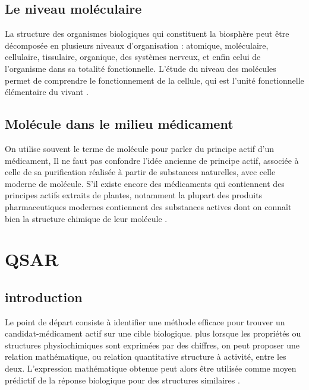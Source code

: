 \documentclass[12pt]{report}
\begin{document}
\subsection{Le niveau moléculaire}
La structure des organismes biologiques qui constituent la biosphère peut être décomposée en plusieurs niveaux d'organisation : atomique, moléculaire, cellulaire, tissulaire, organique, des systèmes nerveux, et enfin celui de l'organisme dans sa totalité fonctionnelle. L'étude du niveau des molécules permet de comprendre le fonctionnement de la cellule, qui est l'unité fonctionnelle élémentaire du vivant \cite{ref8} .

\subsection{Molécule dans le milieu médicament}
On utilise souvent le terme de molécule pour parler du principe actif d'un médicament, Il ne faut pas confondre l'idée ancienne de principe actif, associée à celle de sa purification réalisée à partir de substances naturelles, avec celle moderne de molécule. S'il existe encore des médicaments qui contiennent des principes actifs extraits de plantes, notamment la plupart des produits pharmaceutiques modernes contiennent des substances actives dont on connaît bien la structure chimique de leur molécule \cite{ref8}. 
\newpage
\section{QSAR}
\subsection{introduction}
Le point de départ consiste à identifier une méthode efficace pour trouver un candidat-médicament actif sur une cible biologique. plus lorsque les propriétés ou structures physiochimiques sont exprimées par des chiffres, on peut proposer une relation mathématique, ou relation quantitative structure à activité, entre les deux. L'expression mathématique obtenue peut alors être utilisée comme moyen prédictif de la réponse biologique pour des structures similaires \cite{ref9} .
\end{document}
